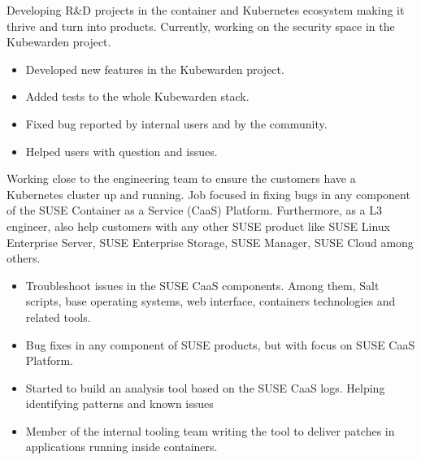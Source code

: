 \documentclass[10pt,a4paper]{altacv}
\begin{document}

\begin{fullwidth}
\makecvheader
\end{fullwidth}


Developing R&D projects in the container and Kubernetes ecosystem making it thrive and turn into products. Currently, working on the security space in the Kubewarden project.
\begin{itemize}
\item Developed new features in the Kubewarden project.
\item Added tests to the whole Kubewarden stack.
\item Fixed bug reported by internal users and by the community.
\item Helped users with question and issues.

\end{itemize}
Working close to the engineering team to ensure the customers have a Kubernetes cluster up and running. Job focused in fixing bugs in any component of the SUSE Container as a Service (CaaS) Platform. Furthermore, as a L3 engineer, also help customers with any other SUSE product like SUSE Linux Enterprise Server, SUSE Enterprise Storage, SUSE Manager, SUSE Cloud among others.
\begin{itemize}
\item Troubleshoot issues in the SUSE CaaS components. Among them, Salt scripts, base operating systems, web interface, containers technologies and related tools.
\item Bug fixes in any component of SUSE products, but with focus on SUSE CaaS Platform.
\item Started to build an analysis tool based on the SUSE CaaS logs. Helping identifying patterns and known issues
\item Member of the internal tooling team writing the tool to deliver patches in applications running inside containers. 
\end{itemize}
\end{document}
